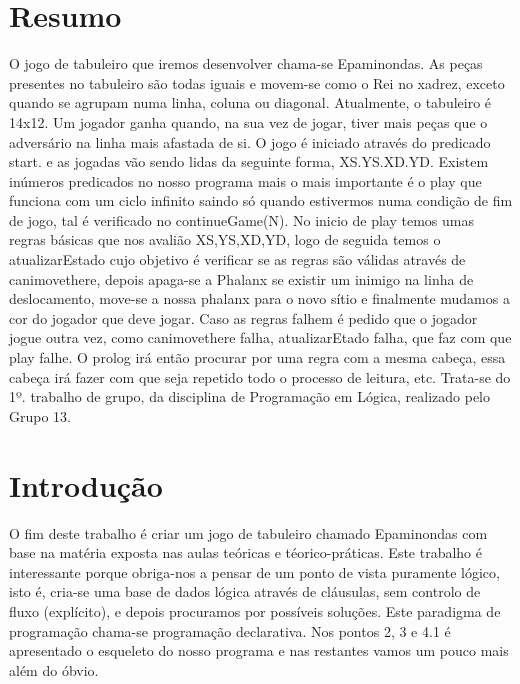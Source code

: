\documentclass[a4paper]{article}
\begin{document}
\newpage

\section*{Resumo}
O jogo de tabuleiro que iremos desenvolver chama-se Epaminondas. As peças presentes no tabuleiro são todas
iguais e movem-se como o Rei no xadrez, exceto quando se agrupam numa linha, coluna ou diagonal. Atualmente, o tabuleiro é 14x12. Um jogador ganha quando, na sua vez de jogar, tiver mais peças que o adversário na linha mais afastada de si. O jogo é iniciado através do predicado start. e as jogadas vão sendo lidas da seguinte forma, XS.YS.XD.YD. Existem inúmeros predicados no nosso programa mais o mais importante é o play que funciona com um ciclo infinito saindo só quando estivermos numa condição de fim de jogo, tal é verificado no continueGame(N). No inicio de play temos umas regras básicas que nos avalião XS,YS,XD,YD, logo de seguida temos o atualizarEstado cujo objetivo é verificar se as regras são válidas através de canimovethere, depois apaga-se a Phalanx se existir um inimigo na linha de deslocamento, move-se a nossa phalanx para o novo sítio e finalmente mudamos a cor do jogador que deve jogar. Caso as regras falhem é pedido que o jogador jogue outra vez, como canimovethere falha, atualizarEtado falha, que faz com que play falhe. O prolog irá então procurar por uma regra com a mesma cabeça, essa cabeça irá fazer com que seja repetido todo o processo de leitura, etc.
Trata-se do 1º. trabalho de grupo, da disciplina de Programação em Lógica, realizado pelo Grupo 13.



\section{Introdução}
O fim deste trabalho é criar um jogo de tabuleiro chamado Epaminondas com base na matéria exposta nas aulas teóricas e téorico-práticas.
Este trabalho é interessante porque obriga-nos a pensar de um ponto de vista puramente lógico, isto é, cria-se uma base de dados
lógica através de cláusulas, sem controlo de fluxo (explícito), e depois procuramos por possíveis soluções. Este paradigma de programação
chama-se programação declarativa. Nos pontos 2, 3 e 4.1 é apresentado o esqueleto do nosso programa e nas restantes vamos um pouco mais além do óbvio.
\end{document}
